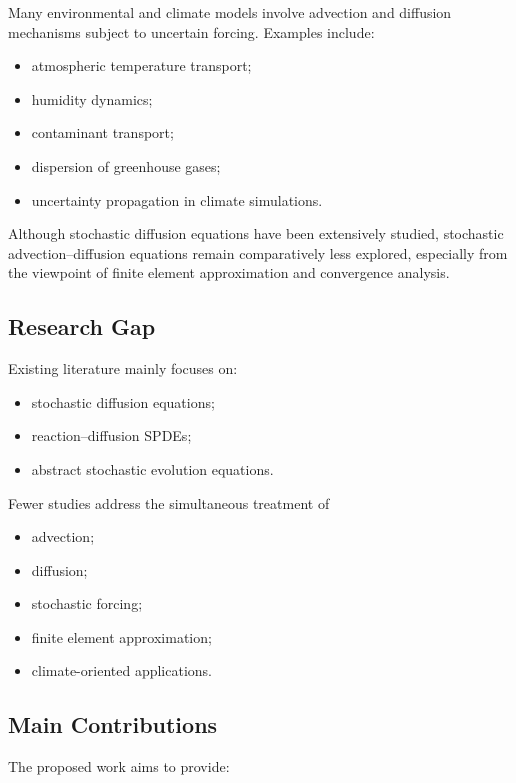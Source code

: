 Many environmental and climate models involve advection and diffusion mechanisms subject to uncertain forcing. Examples include:

\begin{itemize}
\item atmospheric temperature transport;
\item humidity dynamics;
\item contaminant transport;
\item dispersion of greenhouse gases;
\item uncertainty propagation in climate simulations.
\end{itemize}

Although stochastic diffusion equations have been extensively studied, stochastic advection--diffusion equations remain comparatively less explored, especially from the viewpoint of finite element approximation and convergence analysis.

\subsection*{Research Gap}

Existing literature mainly focuses on:

\begin{itemize}
\item stochastic diffusion equations;
\item reaction--diffusion SPDEs;
\item abstract stochastic evolution equations.
\end{itemize}

Fewer studies address the simultaneous treatment of

\begin{itemize}
\item advection;
\item diffusion;
\item stochastic forcing;
\item finite element approximation;
\item climate-oriented applications.
\end{itemize}

\subsection*{Main Contributions}

The proposed work aims to provide:

